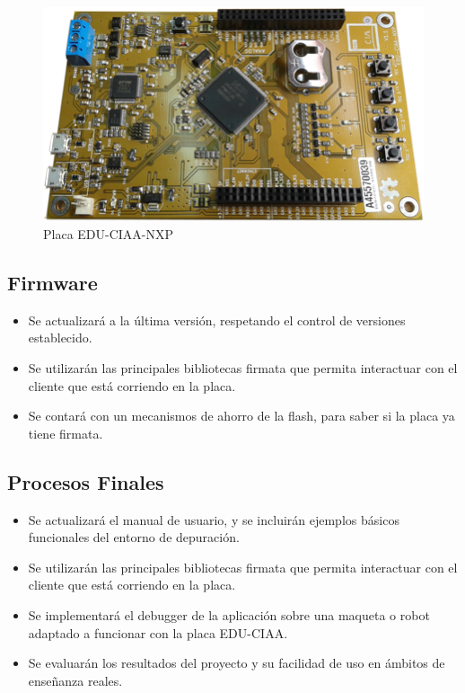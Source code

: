 \begin{figure}[h]
	\centering
	\includegraphics[scale=.50]{./Figures/EDU-CIAA-NXP_Foto.png}
	\caption{Placa EDU-CIAA-NXP}
	\label{fig:edu-ciaa-nxp}
\end{figure}

\subsection{Firmware}

\begin{itemize}
	\item Se actualizará a la última versión, respetando el control de versiones establecido.	
	\item Se utilizarán las principales bibliotecas firmata que permita interactuar con el cliente que está corriendo en la placa.
	\item Se contará con un mecanismos de ahorro de la flash, para saber si la placa ya tiene firmata.
\end{itemize}

\subsection{Procesos Finales}

\begin{itemize}
	\item Se actualizará el manual de usuario, y se incluirán ejemplos básicos funcionales del entorno de depuración.	
	\item Se utilizarán las principales bibliotecas firmata que permita interactuar con el cliente que está corriendo en la placa.
	\item Se implementará el debugger de la aplicación sobre una maqueta o robot adaptado a funcionar con la placa EDU-CIAA.
	\item Se evaluarán los resultados del proyecto y su facilidad de uso en ámbitos de enseñanza reales.
\end{itemize}


